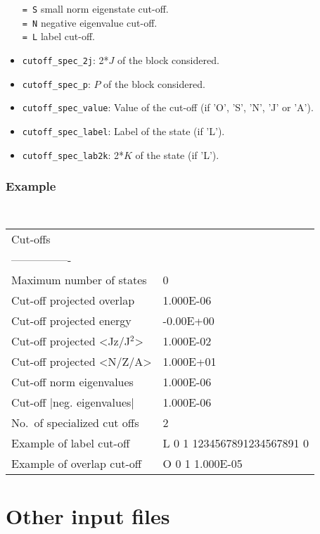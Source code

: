 \documentclass[a4paper,11pt]{article}
\newcommand{\ttt}[1]{\texttt{#1}}
\begin{document}
\begin{itemize}
 \ttt{= S\:} small norm eigenstate cut-off. \\[0.05cm]
 \ttt{= N\:} negative eigenvalue cut-off. \\[0.05cm]
 \ttt{= L\:} label cut-off. 
\item \ttt{cutoff\_spec\_2j}: 2*$J$ of the block considered.
\item \ttt{cutoff\_spec\_p}: $P$ of the block considered.
\item \ttt{cutoff\_spec\_value}: Value of the cut-off (if 'O', 'S', 'N', 'J' or 'A').
\item \ttt{cutoff\_spec\_label}: Label of the state (if 'L').
\item \ttt{cutoff\_spec\_lab2k}: 2*$K$ of the state (if 'L').
\end{itemize}

\subsubsection*{Example}
\begin{center}
\tt
\begin{tabular}{|ll|}
\hline
Cut-offs                      &          \\
----------------              &          \\
Maximum number of states      &0         \\
Cut-off projected overlap     &1.000E-06 \\
Cut-off projected energy      &-0.00E+00 \\
Cut-off projected <Jz/J$^2$>  &1.000E-02 \\
Cut-off projected <N/Z/A>     &1.000E+01 \\
Cut-off norm eigenvalues      &1.000E-06 \\
Cut-off |neg. eigenvalues|    &1.000E-06 \\
No.~of specialized cut offs   &2         \\
Example of label cut-off      &L \phantom{0}0 \phantom{0}1 1234567891234567891 \phantom{0}0  \\
Example of overlap cut-off    &O \phantom{0}0 \phantom{0}1 1.000E-05 \\
\hline
\end{tabular}
\end{center}

%
% 
\section{Other input files}
\end{document}
